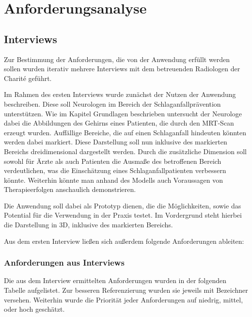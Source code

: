 
\chapter{Anforderungsanalyse}
\label{anforderung}

\section{Interviews}

Zur Bestimmung der Anforderungen, die von der Anwendung erfüllt werden sollen wurden iterativ mehrere Interviews mit dem betreuenden Radiologen der Charité geführt.


Im Rahmen des ersten Interviews wurde zunächst der Nutzen der Anwendung beschreiben.
Diese soll Neurologen im Bereich der Schlaganfallprävention unterstützen. Wie im Kapitel Grundlagen beschrieben untersucht der Neurologe dabei die Abbildungen des Gehirns eines Patienten, die durch den MRT-Scan erzeugt wurden. Auffällige Bereiche, die auf einen Schlaganfall hindeuten könnten werden dabei markiert. 
Diese Darstellung soll nun inklusive des markierten Bereichs dreidimensional dargestellt werden. Durch die zusätzliche Dimension soll sowohl für Ärzte als auch Patienten die Ausmaße des betroffenen Bereich verdeutlichen, was die Einschätzung eines Schlaganfallpatienten verbessern könnte.
Weiterhin könnte man anhand des Modells auch Voraussagen von Therapieerfolgen anschaulich demonstrieren.

Die Anwendung soll dabei als Prototyp dienen, die die Möglichkeiten, sowie das Potential für die Verwendung in der Praxis testet. Im Vordergrund steht hierbei die Darstellung in 3D, inklusive des markierten Bereichs.


Aus dem ersten Interview ließen sich außerdem folgende Anforderungen ableiten:

\subsection{Anforderungen aus Interviews}
Die aus dem Interview ermittelten Anforderungen wurden in der folgenden Tabelle aufgelistet. Zur besseren Referenzierung wurden sie jeweils mit Bezeichner versehen. Weiterhin wurde die Priorität jeder Anforderungen auf niedrig, mittel, oder hoch geschätzt.

